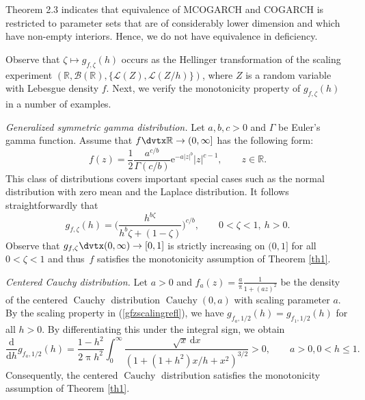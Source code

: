 \documentclass[number,citesort,seceqn,dvips]{arxbj}
\newcommand{\eqref}[1]{(\ref{#1})}
\newcommand{\RR}{\mathbb{R}}
\newcommand{\BBB}{{\mathcal B}}
\newcommand{\LLL}{{\mathcal L}}
\begin{document}
Theorem 2.3 indicates that equivalence of MCOGARCH and COGARCH is
restricted to parameter sets that are of considerably lower dimension
and which have non-empty interiors. Hence, we do not have equivalence
in deficiency.

Observe that $\zeta\mapsto g_{f,\zeta}(h)$ occurs as the Hellinger
transformation of the scaling experiment
$(\RR,\BBB(\RR),\{\LLL(Z),\LLL(Z/h)\})$, where $Z$ is a random variable
with
Lebesgue density $f$. Next, we verify the monotonicity property of
$g_{f,\zeta}(h)$ in a number of examples.

\textit{Generalized symmetric gamma distribution.} Let $a,b,c>0$ and
$\Gamma$ be Euler's gamma function. Assume that $f\dvtx\RR\to(0,\infty]$
has the following form:
%
\[
f(z) =  \frac12 \frac{a^{c/b}}{\Gamma(c/b)} \mathrm{e}^{-a|z|^b}|z|^{c-1},\qquad  z\in\RR .
\]
%
This class of distributions covers important special cases such as the
normal distribution with zero mean and the Laplace distribution. It
follows straightforwardly that
%
\[
g_{f, \zeta}(h) =  \biggl(\frac{h^{b\zeta}}{h^b\zeta+(1-\zeta
)} \biggr)^{c/b},\qquad 0<\zeta<1,\  h>0 .
\]
%
Observe that $g_{f,\zeta}\dvtx(0,\infty)\to[0,1]$ is strictly increasing
on $(0,1]$ for all $0 < \zeta < 1$ and thus~$f$ satisfies the monotonicity assumption of Theorem \ref{th1}.

\textit{Centered Cauchy distribution.} Let $a>0$ and $f_a(z)= \frac
a{\uppi}\frac1{1+(az)^2}$ be the density of the centered $\operatorname{Cauchy}$
distribution $\operatorname{Cauchy}(0,a)$ with scaling parameter $a$. By the scaling
property in \eqref{gfzscalingrefl}, we have
$g_{f_a, 1/2}(h)=g_{f_1, 1/2}(h)$ for all $h>0$. By differentiating
this under the integral sign, we obtain
%
\[
\frac{\mathrm{d}}{\mathrm{d}h}g_{f_a, 1/2}(h)=\frac{1 - h^2}{2\uppi h^2} \int
_0^\infty
\frac{\sqrt{x}\,\mathrm{d}x}{(1+(1+h^2)x/h+x^2)^{3/2}}>0,\qquad
a>0 , 0<h\le1 .
\]
%
Consequently, the centered $\operatorname{Cauchy}$ distribution
satisfies the monotonicity assumption of Theorem \ref{th1}.
\end{document}
